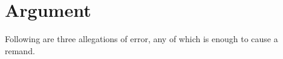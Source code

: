 \documentclass[12pt,\documentclassflag]{michiganCourtOfAppealsBrief}
\begin{document}

	




\section{Argument}
 
Following are three allegations of error, any of which is enough to cause a remand. 
\end{document}
